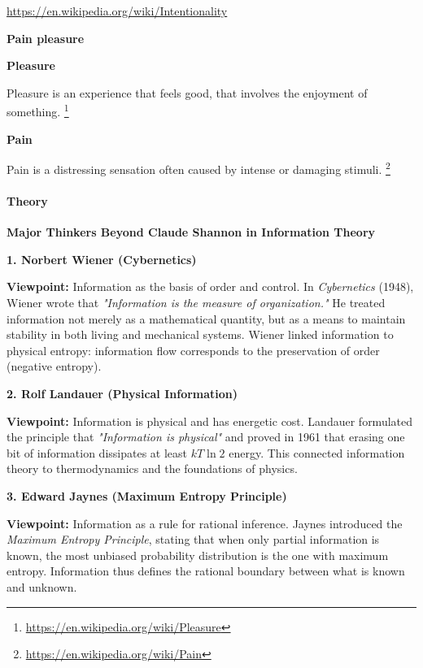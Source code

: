 \documentclass{book}
\providecommand{\ProjectDeepHeading}[2]{%
    \par\medskip\noindent\textbf{#2}\par\smallskip
}
\providecommand{\seeherefooter}[1]{\footnote{\url{#1}}}
\begin{document}
\url{https://en.wikipedia.org/wiki/Intentionality}

\ProjectDeepHeading{1}{Pain pleasure}


\ProjectDeepHeading{4}{Pleasure}
        Pleasure is an experience that feels good, that involves the enjoyment of something.
        \seeherefooter{https://en.wikipedia.org/wiki/Pleasure}
    
    
    \ProjectDeepHeading{4}{Pain}
        Pain is a distressing sensation often caused by intense or damaging stimuli.
        \seeherefooter{https://en.wikipedia.org/wiki/Pain}

\paragraph{Theory}


\ProjectDeepHeading{2}{Major Thinkers Beyond Claude Shannon in Information Theory}
    
    \ProjectDeepHeading{3}{1. Norbert Wiener (Cybernetics)}
        \textbf{Viewpoint:} Information as the basis of order and control.
        In \textit{Cybernetics} (1948), Wiener wrote that
        \emph{"Information is the measure of organization."}
        He treated information not merely as a mathematical quantity, but as a means to maintain stability in both living and mechanical systems.
        Wiener linked information to physical entropy: information flow corresponds to the preservation of order (negative entropy).
    
    \ProjectDeepHeading{3}{2. Rolf Landauer (Physical Information)}
        \textbf{Viewpoint:} Information is physical and has energetic cost.
        Landauer formulated the principle that \emph{"Information is physical"} and proved in 1961 that erasing one bit of information dissipates at least $kT \ln 2$ energy.
        This connected information theory to thermodynamics and the foundations of physics.
    
    \ProjectDeepHeading{3}{3. Edward Jaynes (Maximum Entropy Principle)}
        \textbf{Viewpoint:} Information as a rule for rational inference.
        Jaynes introduced the \textit{Maximum Entropy Principle}, stating that when only partial information is known,
        the most unbiased probability distribution is the one with maximum entropy.
        Information thus defines the rational boundary between what is known and unknown.
    
\end{document}
